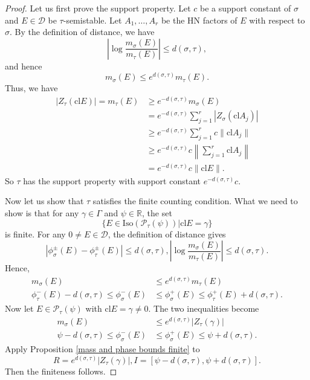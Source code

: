 \documentclass[a4paper,12pt]{amsart}
\numberwithin{equation}{section}
\newcommand{\Iso}{\mathrm{Iso}}
\newcommand{\cl}{\mathrm{cl}}
\newcommand{\1}{\mathbf{1}}
\begin{document}
\begin{proof}
    Let us first prove the support property. Let $c$ be a support constant of $\sigma$ and $E\in\mathcal{D}$ be $\tau$-semistable. Let $A_1,\dots,A_r$ be the HN factors of $E$ with respect to $\sigma$. By the definition of distance, we have
    \[\left|\log\dfrac{m_\sigma(E)}{m_\tau(E)}\right|\leqslant d(\sigma,\tau),\]
    and hence
    \[m_\sigma(E)\leqslant e^{d(\sigma,\tau)}m_\tau(E).\]
    Thus, we have
    \begin{align*}
        |Z_\tau(\cl E)|=m_\tau(E)&\geqslant e^{-d(\sigma,\tau)}m_\sigma(E)\\
        &=e^{-d(\sigma,\tau)}\sum_{j=1}^r|Z_\sigma(\cl A_j)|\\
        &\geqslant e^{-d(\sigma,\tau)}\sum_{j=1}^r c\|\cl A_j\|\\
        &\geqslant e^{-d(\sigma,\tau)}c\left\|\sum_{j=1}^r \cl A_j\right\|\\
        &=e^{-d(\sigma,\tau)}c\|\cl E\|.
    \end{align*}
    So $\tau$ has the support property with support constant $e^{-d(\sigma,\tau)}c$.

    Now let us show that $\tau$ satisfies the finite counting condition. What we need to show is that for any $\gamma\in\Gamma$ and $\psi\in\mathbb{R}$, the set
    \[\{E\in\Iso(\mathcal{P}_\tau(\psi))|\cl E=\gamma\}\]
    is finite. For any $0\neq E\in\mathcal{D}$, the definition of distance gives
    \[|\phi_\sigma^{\pm}(E)-\phi_\tau^{\pm}(E)|\leqslant d(\sigma,\tau),\left|\log\dfrac{m_\sigma(E)}{m_\tau(E)}\right|\leqslant d(\sigma,\tau).\]
    Hence,
    \begin{align*}
        m_\sigma(E)&\leqslant e^{d(\sigma,\tau)}m_\tau(E)\\
        \phi_\tau^-(E)-d(\sigma,\tau)\leqslant\phi_\sigma^-(E)&\leqslant\phi_\sigma^+(E)\leqslant\phi_\tau^+(E)+d(\sigma,\tau).
    \end{align*}
    Now let $E\in\mathcal{P}_\tau(\psi)$ with $\cl E=\gamma\neq0$. The two inequalities become
    \begin{align*}
        m_\sigma(E)&\leqslant e^{d(\sigma,\tau)}|Z_\tau(\gamma)|\\
        \psi-d(\sigma,\tau)\leqslant\phi_\sigma^-(E)&\leqslant\phi_\sigma^+(E)\leqslant\psi+d(\sigma,\tau).
    \end{align*}
    Apply Proposition \ref{mass and phase bounds finite} to
    \[R=e^{d(\sigma,\tau)}|Z_\tau(\gamma)|,I=[\psi-d(\sigma,\tau),\psi+d(\sigma,\tau)].\]
    Then the finiteness follows.
\end{proof}
\end{document}
